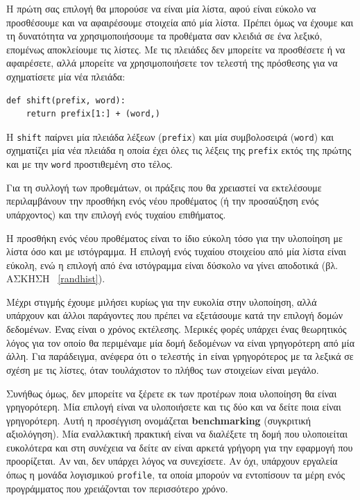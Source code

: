 \documentclass[10pt]{book}
\begin{document}
Η πρώτη σας επιλογή θα μπορούσε να είναι μία λίστα, αφού είναι εύκολο να προσθέσουμε και να αφαιρέσουμε στοιχεία από μία λίστα. Πρέπει όμως να έχουμε και τη δυνατότητα να χρησιμοποιήσουμε τα προθέματα σαν κλειδιά σε ένα λεξικό, επομένως αποκλείουμε τις λίστες. Με τις πλειάδες δεν μπορείτε να προσθέσετε ή να αφαιρέσετε, αλλά μπορείτε να χρησιμοποιήσετε τον τελεστή της πρόσθεσης για να σχηματίσετε μία νέα πλειάδα:

\begin{verbatim}
def shift(prefix, word):
    return prefix[1:] + (word,)
\end{verbatim}
%
Η {\tt shift} παίρνει μία πλειάδα λέξεων ({\tt prefix}) και μία συμβολοσειρά ({\tt word}) και σχηματίζει μία νέα πλειάδα η οποία έχει όλες τις λέξεις της {\tt prefix} εκτός της πρώτης και με την {\tt word} προστιθεμένη στο τέλος.

Για τη συλλογή των προθεμάτων, οι πράξεις που θα χρειαστεί να εκτελέσουμε περιλαμβάνουν την προσθήκη ενός νέου προθέματος (ή την προσαύξηση ενός υπάρχοντος) και την επιλογή ενός τυχαίου επιθήματος.

Η προσθήκη ενός νέου προθέματος είναι το ίδιο εύκολη τόσο για την υλοποίηση με λίστα όσο και με ιστόγραμμα. 
Η επιλογή ενός τυχαίου στοιχείου από μία λίστα είναι εύκολη, ενώ η επιλογή από ένα ιστόγραμμα είναι δύσκολο να 
γίνει αποδοτικά (βλ. ΑΣΚΗΣΗ ~\ref{randhist}).

Μέχρι στιγμής έχουμε μιλήσει κυρίως για την ευκολία στην υλοποίηση, αλλά υπάρχουν και άλλοι παράγοντες που πρέπει 
να εξετάσουμε κατά την επιλογή δομών δεδομένων. Ένας είναι ο χρόνος εκτέλεσης. Μερικές φορές υπάρχει ένας θεωρητικός λόγος για τον οποίο θα περιμέναμε μία δομή δεδομένων να είναι γρηγορότερη από μία άλλη. Για παράδειγμα, ανέφερα ότι ο τελεστής {\tt in} είναι γρηγορότερος με τα λεξικά σε σχέση με τις λίστες, όταν τουλάχιστον το πλήθος των στοιχείων είναι μεγάλο.

Συνήθως όμως, δεν μπορείτε να ξέρετε εκ των προτέρων ποια υλοποίηση θα είναι γρηγορότερη. Μία επιλογή είναι να υλοποιήσετε και τις δύο και να δείτε ποια είναι γρηγορότερη. Αυτή η προσέγγιση ονομάζεται {\bf benchmarking} (συγκριτική αξιολόγηση). Μία εναλλακτική πρακτική είναι να διαλέξετε τη δομή που υλοποιείται ευκολότερα και στη συνέχεια να δείτε αν είναι αρκετά γρήγορη για την εφαρμογή που προορίζεται. Αν ναι, δεν υπάρχει λόγος να συνεχίσετε. Αν όχι, υπάρχουν εργαλεία όπως η μονάδα λογισμικού {\tt profile}, τα οποία μπορούν να εντοπίσουν τα μέρη ενός προγράμματος που χρειάζονται τον περισσότερο χρόνο.
\end{document}
